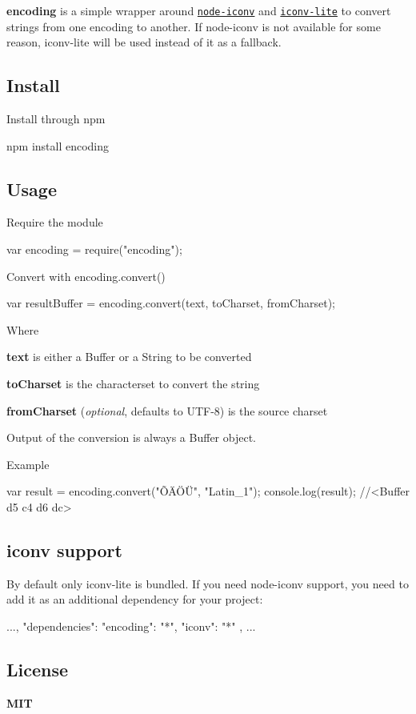 {\bfseries encoding} is a simple wrapper around \href{https://github.com/bnoordhuis/node-iconv}{\tt node-\/iconv} and \href{https://github.com/ashtuchkin/iconv-lite/}{\tt iconv-\/lite} to convert strings from one encoding to another. If node-\/iconv is not available for some reason, iconv-\/lite will be used instead of it as a fallback.

\href{http://travis-ci.org/andris9/Nodemailer}{\tt } \href{http://badge.fury.io/js/encoding}{\tt }

\subsection*{Install}

Install through npm \begin{DoxyVerb}npm install encoding
\end{DoxyVerb}


\subsection*{Usage}

Require the module \begin{DoxyVerb}var encoding = require("encoding");
\end{DoxyVerb}


Convert with encoding.\+convert() \begin{DoxyVerb}var resultBuffer = encoding.convert(text, toCharset, fromCharset);
\end{DoxyVerb}


Where


\begin{DoxyItemize}
\item {\bfseries text} is either a Buffer or a String to be converted
\item {\bfseries to\+Charset} is the characterset to convert the string
\item {\bfseries from\+Charset} ({\itshape optional}, defaults to U\+T\+F-\/8) is the source charset
\end{DoxyItemize}

Output of the conversion is always a Buffer object.

Example \begin{DoxyVerb}var result = encoding.convert("ÕÄÖÜ", "Latin_1");
console.log(result); //<Buffer d5 c4 d6 dc>
\end{DoxyVerb}


\subsection*{iconv support}

By default only iconv-\/lite is bundled. If you need node-\/iconv support, you need to add it as an additional dependency for your project\+: \begin{DoxyVerb}...,
"dependencies":{
    "encoding": "*",
    "iconv": "*"
},
...
\end{DoxyVerb}


\subsection*{License}

{\bfseries M\+IT} 